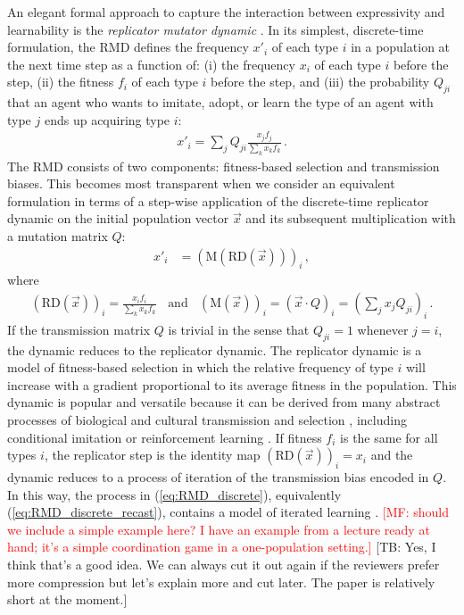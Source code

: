 \documentclass[a4paper]{article}
\newcommand{\mf}[1]{\textcolor{Red}{[MF: #1]}}
\newcommand{\tb}[1]{\textcolor[rgb]{.8,.33,.0}{[TB: #1]}}%
\begin{document}
An elegant formal approach to capture the interaction between expressivity and learnability
is the \emph{replicator mutator dynamic}
\citep{Hofbauer1985:The-Selection-M,nowak+etal:2000,NowakKomarova2001:Evolution-of-Un,hofbauer+sigmund:2003,Nowak2006:Evolutionary-Dy}. In
its simplest, discrete-time formulation, the RMD defines the frequency $x'_i$ of each type $i$
in a population at the next time step as a function of: (i) the frequency $x_i$ of each type
$i$ before the step, (ii) the fitness $f_i$ of each type $i$ before the step, and (iii) the
probability $Q_{ji}$ that an agent who wants to imitate, adopt, or learn the type of an agent
with type $j$ ends up acquiring type $i$:
\begin{align}
  \label{eq:RMD_discrete}
  x'_i = \sum_j Q_{ji} \frac{x_jf_j}{\sum_k x_k f_k}\,.
\end{align}
The RMD consists of two components: fitness-based selection and transmission biases. This
becomes most transparent when we consider an equivalent formulation in terms of a step-wise
application of the discrete-time replicator dynamic \citep{TaylorJonker1978:Evolutionary-St} on the initial population vector $\vec{x}$
and its subsequent multiplication with a mutation matrix $Q$:
\begin{align}
  \label{eq:RMD_discrete_recast}
  x'_i & = (\text{M}(\text{RD}(\vec{x})))_i\,,
\end{align}
where
\begin{align*}
      \left ( \text{RD}(\vec{x}) \right )_i 
         = \frac{x_i f_i}{\sum_k x_k f_k}
 \ \ \ \ \text{and} \ \ \ \ 
  (\text{M}(\vec{x}))_i = (\vec{x} \cdot Q)_i = \left ( \sum_j
          x_j Q_{ji} \right)_i\,.
\end{align*}
If the transmission matrix $Q$ is trivial in the sense that $Q_{ji}=1$ whenever $j=i$, the
dynamic reduces to the replicator dynamic. The replicator dynamic is a model of fitness-based
selection in which the relative frequency of type $i$ will increase with a gradient
proportional to its average fitness in the population. This dynamic is popular and
versatile because it can be derived from many abstract processes of biological and cultural
transmission and selection \citep[for overview and several derivations
see][]{Sandholm2010:Population-Game}, including conditional imitation
\citep[e.g.,][]{Helbing1996:A-Stochastic-Be,Schlag1998:Why-Imitate-and} or reinforcement
learning \citep[e.g.,][]{BorgersSarin997:Learning-Throug,Beggs2005:On-the-Converge}. If fitness
$f_i$ is the same for all types $i$, the replicator step is the identity map
$ \left ( \text{RD}(\vec{x}) \right )_i = x_i$ and the dynamic reduces to a process of
iteration of the transmission bias encoded in $Q$. In this way, the process in
(\ref{eq:RMD_discrete}), equivalently (\ref{eq:RMD_discrete_recast}), contains a model of
iterated learning \citep{griffiths+kalish:2007}. \mf{should we include a simple example here? I 
have an example from a lecture ready at hand; it's a simple coordination game in a
one-population setting.} \tb{Yes, I think that's a good idea. We can always cut it out again if the reviewers prefer more compression but let's explain more and cut later. The paper is relatively short at the moment.} 
\end{document}
